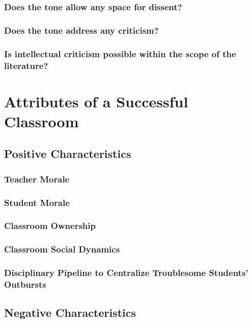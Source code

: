 \documentclass[12pt]{article}
\begin{document}
	\subsubsection{Does the tone allow any space for dissent?}
	\subsubsection{Does the tone address any criticism?}
	\subsubsection{Is intellectual criticism possible within the scope of the literature?}
	
	\section{Attributes of a Successful Classroom}
	\subsection{Positive Characteristics}
	\subsubsection{Teacher Morale}
	\subsubsection{Student Morale}
	\subsubsection{Classroom Ownership}
	\subsubsection{Classroom Social Dynamics}
	\subsubsection{Disciplinary Pipeline to Centralize Troublesome Students' Outbursts}
	\subsection{Negative Characteristics}
\end{document}
